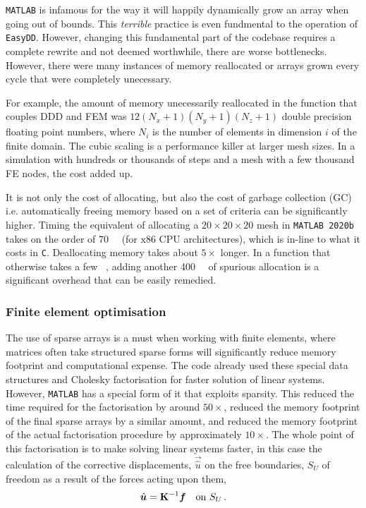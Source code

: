 \texttt{MATLAB} is infamous for the way it will happily dynamically grow an array when going out of bounds. This \emph{terrible} practice is even fundmental to the operation of \texttt{EasyDD}. However, changing this fundamental part of the codebase requires a complete rewrite and not deemed worthwhile, there are worse bottlenecks. However, there were many instances of memory reallocated or arrays grown every cycle that were completely unecessary.

For example, the amount of memory unecessarily reallocated in the function that couples DDD and FEM was $12(N_x + 1)(N_y + 1)(N_z + 1)$ double precision floating point numbers, where $N_i$ is the number of elements in dimension $i$ of the finite domain. The cubic scaling is a performance killer at larger mesh sizes. In a simulation with hundreds or thousands of steps and a mesh with a few thousand FE nodes, the cost added up.

It is not only the cost of allocating, but also the cost of garbage collection (GC) \cite{hanson1990fast} i.e. automatically freeing memory based on a set of criteria can be significantly higher. Timing the equivalent of allocating a $20 \times 20 \times 20$ mesh in \texttt{MATLAB 2020b} takes on the order of \SI{70}{\micro\sec} (for x86 CPU architectures), which is in-line to what it costs in \texttt{C}. Deallocating memory takes about $5 \times$ longer. In a function that otherwise takes a few \si{\milli\sec}, adding another \SI{400}{\micro\sec} of spurious allocation is a significant overhead that can be easily remedied.


\subsubsection{Finite element optimisation}

The use of sparse arrays is a must when working with finite elements, where matrices often take structured sparse forms will significantly reduce memory footprint and computational expense. The code already used these special data structures and Cholesky factorisation for faster solution of linear systems. However, \texttt{MATLAB} has a special form of it that exploits sparsity. This reduced the time required for the factorisation by around $50\times$, reduced the memory footprint of the final sparse arrays by a similar amount, and reduced the memory footprint of the actual factorisation procedure by approximately $10 \times$. The whole point of this factorisation is to make solving linear systems faster, in this case the calculation of the corrective displacements, $\vec{\hat{u}}$ on the free boundaries, $S_U$ of freedom as a result of the forces acting upon them,
\begin{align}
    \vec{\hat{u}} = \mtx{K}^{-1} \vec{f}\quad \text{on } S_U\,.
\end{align}


